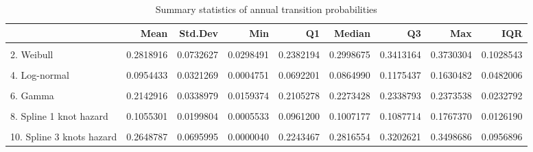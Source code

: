 \documentclass[]{article}
\begin{document}
\begin{table}
\caption{\label{tab:validate_extrapolation2}Summary statistics of annual transition probabilities}
\begin{tabular}[t]{lrrrrrrrr}
\toprule
  & Mean & Std.Dev & Min & Q1 & Median & Q3 & Max & IQR\\
\midrule
\cellcolor{gray!6}{1. Exponential} & \cellcolor{gray!6}{0.1278820} & \cellcolor{gray!6}{0.0000000} & \cellcolor{gray!6}{0.1278820} & \cellcolor{gray!6}{0.1278820} & \cellcolor{gray!6}{0.1278820} & \cellcolor{gray!6}{0.1278820} & \cellcolor{gray!6}{0.1278820} & \cellcolor{gray!6}{0.0000000}\\
2. Weibull & 0.2818916 & 0.0732627 & 0.0298491 & 0.2382194 & 0.2998675 & 0.3413164 & 0.3730304 & 0.1028543\\
\cellcolor{gray!6}{3. Gompertz} & \cellcolor{gray!6}{0.5313783} & \cellcolor{gray!6}{0.3082529} & \cellcolor{gray!6}{0.0960264} & \cellcolor{gray!6}{0.2326209} & \cellcolor{gray!6}{0.5026105} & \cellcolor{gray!6}{0.8415103} & \cellcolor{gray!6}{1.0000000} & \cellcolor{gray!6}{0.6074770}\\
4. Log-normal & 0.0954433 & 0.0321269 & 0.0004751 & 0.0692201 & 0.0864990 & 0.1175437 & 0.1630482 & 0.0482006\\
\cellcolor{gray!6}{5. Log-logistic} & \cellcolor{gray!6}{0.0853562} & \cellcolor{gray!6}{0.0400803} & \cellcolor{gray!6}{0.0150627} & \cellcolor{gray!6}{0.0512119} & \cellcolor{gray!6}{0.0722192} & \cellcolor{gray!6}{0.1148301} & \cellcolor{gray!6}{0.1673124} & \cellcolor{gray!6}{0.0634470}\\
6. Gamma & 0.2142916 & 0.0338979 & 0.0159374 & 0.2105278 & 0.2273428 & 0.2338793 & 0.2373538 & 0.0232792\\
\cellcolor{gray!6}{7. Generalised Gamma} & \cellcolor{gray!6}{0.0527725} & \cellcolor{gray!6}{0.0403634} & \cellcolor{gray!6}{0.0000000} & \cellcolor{gray!6}{0.0249765} & \cellcolor{gray!6}{0.0361491} & \cellcolor{gray!6}{0.0643696} & \cellcolor{gray!6}{0.1783037} & \cellcolor{gray!6}{0.0392711}\\
8. Spline 1 knot hazard & 0.1055301 & 0.0199804 & 0.0005533 & 0.0961200 & 0.1007177 & 0.1087714 & 0.1767370 & 0.0126190\\
\cellcolor{gray!6}{9. Spline 2 knots hazard} & \cellcolor{gray!6}{0.2108105} & \cellcolor{gray!6}{0.0424037} & \cellcolor{gray!6}{0.0000006} & \cellcolor{gray!6}{0.1921569} & \cellcolor{gray!6}{0.2213494} & \cellcolor{gray!6}{0.2415978} & \cellcolor{gray!6}{0.2568265} & \cellcolor{gray!6}{0.0493204}\\
10. Spline 3 knots hazard & 0.2648787 & 0.0695995 & 0.0000040 & 0.2243467 & 0.2816554 & 0.3202621 & 0.3498686 & 0.0956896\\

\end{tabular}
\end{table}
\end{document}
